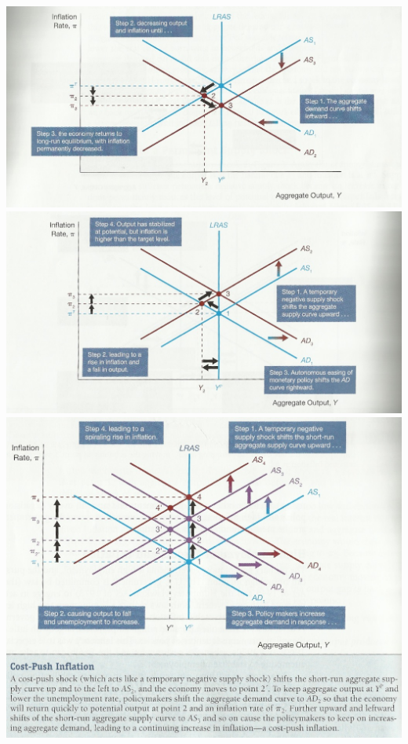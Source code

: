 \documentclass[12pt]{examnotes}
\begin{document}
\includegraphics[scale=0.5]{./imgs/c24f1.jpg}
\includegraphics[scale=0.5]{./imgs/c24f7.jpg}
\includegraphics[scale=0.4]{./imgs/c24f9.jpg}
\end{document}
